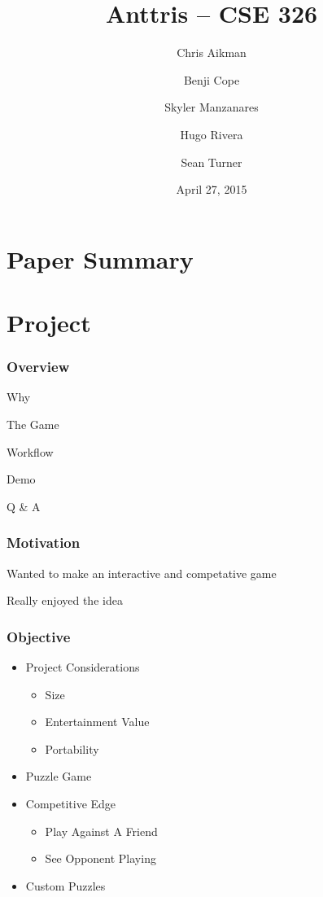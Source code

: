 \documentclass{beamer}
\title{Anttris -- CSE 326}
\author{%
\and Chris Aikman
\and Benji Cope
\and Skyler Manzanares
\and Hugo Rivera
\and Sean Turner}
\date{April 27, 2015}
\begin{document}
\section{Paper Summary}





\section{Project}

\begin{frame}
\end{frame}

\begin{frame}
  \frametitle{Overview} %
  \item Why
  \item The Game
  \item Workflow
  \item Demo
  \item Q & A
\end{frame}

\begin{frame}
  \frametitle{Motivation} %
  \pause \item Wanted to make an interactive and competative game
  \pause \item Really enjoyed the idea
\end{frame}

\begin{frame}
  \frametitle{Objective} %
  \begin{itemize}
	\item Project Considerations
	\begin{itemize}
		\pause \item Size
		\pause \item Entertainment Value
		\pause \item Portability
	\end{itemize}
	\pause \item Puzzle Game
	\pause \item Competitive Edge
	\begin{itemize}
		\pause \item Play Against A Friend
		\pause \item See Opponent Playing
	\end{itemize}
	\pause \item Custom Puzzles
  \end{itemize}
\end{frame}
\end{document}
